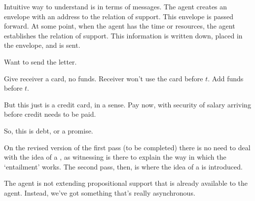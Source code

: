 {
  \color{red}
  \begin{note}
    Intuitive way to understand is in terms of messages.
    The agent creates an envelope with an address to the relation of support.
    This envelope is passed forward.
    At some point, when the agent has the time or resources, the agent establishes the relation of support.
    This information is written down, placed in the envelope, and is sent.

    Want to send the letter.
  \end{note}

  \begin{note}
    Give receiver a card, no funds.
    Receiver won't use the card before \(t\).
    Add funds before \(t\).

    But this just is a credit card, in a sense.
    Pay now, with security of salary arriving before credit needs to be paid.

    So, this is debt, or a promise.
  \end{note}
}

{
  \begin{note}[Notes]
    On the revised version of the first pass (to be completed) there is no need to deal with the idea of a \future{}, as witnessing is there to explain the way in which the `entailment' works.
    The second pass, then, is where the idea of a \future{} is introduced.

    The agent is not extending propositional support that is already available to the agent.
    Instead, we've got something that's really asynchronous.
  \end{note}

}

